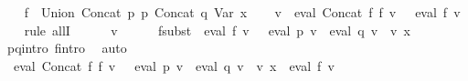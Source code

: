 \begin{isabellebody}
\ \ \isamarkupfalse%
\ {\isacharquery}{\kern0pt}f{\isacharprime}{\kern0pt}\ {\isacharequal}{\kern0pt}\ {\isachardoublequoteopen}Union\ {\isacharparenleft}{\kern0pt}Concat\ p{}\ p{}{\isacharparenright}{\kern0pt}\ {\isacharparenleft}{\kern0pt}Concat\ {\isacharquery}{\kern0pt}q{\isacharprime}{\kern0pt}\ {\isacharparenleft}{\kern0pt}Var\ x{\isacharparenright}{\kern0pt}{\isacharparenright}{\kern0pt}{\isachardoublequoteclose}\isanewline
\ \ \isamarkupfalse%
\ {\isachardoublequoteopen}{\isasymforall}v{\isachardot}{\kern0pt}\ {\isacharparenleft}{\kern0pt}{\isasymPsi}\ {\isacharparenleft}{\kern0pt}eval\ {\isacharparenleft}{\kern0pt}Concat\ f{}\ f{}{\isacharparenright}{\kern0pt}\ v{\isacharparenright}{\kern0pt}\ {\isacharequal}{\kern0pt}\ {\isasymPsi}\ {\isacharparenleft}{\kern0pt}eval\ {\isacharquery}{\kern0pt}f{\isacharprime}{\kern0pt}\ v{\isacharparenright}{\kern0pt}{\isacharparenright}{\kern0pt}{\isachardoublequoteclose}\isanewline
\ \ \isamarkupfalse%
\ {\isacharparenleft}{\kern0pt}rule\ allI{\isacharparenright}{\kern0pt}\isanewline
\ \ \ \ \isamarkupfalse%
\ v\isanewline
\ \ \ \ \isamarkupfalse%
\ f{}{\isacharunderscore}{\kern0pt}subst{\isacharcolon}{\kern0pt}\ {\isachardoublequoteopen}{\isasymPsi}\ {\isacharparenleft}{\kern0pt}eval\ f{}\ v{\isacharparenright}{\kern0pt}\ {\isacharequal}{\kern0pt}\ {\isasymPsi}\ {\isacharparenleft}{\kern0pt}eval\ p{}\ v\ {\isasymunion}\ eval\ q{}\ v\ {\isacharat}{\kern0pt}{\isacharat}{\kern0pt}\ v\ x{\isacharparenright}{\kern0pt}{\isachardoublequoteclose}\isanewline
\ \ \ \ \ \ \isamarkupfalse%
\ p{}{\isacharunderscore}{\kern0pt}q{}{\isacharunderscore}{\kern0pt}intro\ f{}{\isacharprime}{\kern0pt}{\isacharunderscore}{\kern0pt}intro\ \isamarkupfalse%
\ auto\isanewline
\ \ \ \ \isamarkupfalse%
\ {\isachardoublequoteopen}{\isasymPsi}\ {\isacharparenleft}{\kern0pt}eval\ {\isacharparenleft}{\kern0pt}Concat\ f{}\ f{}{\isacharparenright}{\kern0pt}\ v{\isacharparenright}{\kern0pt}\ {\isacharequal}{\kern0pt}\ {\isasymPsi}\ {\isacharparenleft}{\kern0pt}{\isacharparenleft}{\kern0pt}eval\ p{}\ v\ {\isasymunion}\ eval\ q{}\ v\ {\isacharat}{\kern0pt}{\isacharat}{\kern0pt}\ v\ x{\isacharparenright}{\kern0pt}\ {\isacharat}{\kern0pt}{\isacharat}{\kern0pt}\ eval\ f{}\ v{\isacharparenright}{\kern0pt}{\isachardoublequoteclose}\isanewline

\end{isabellebody}
